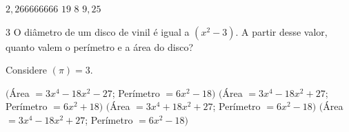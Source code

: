 \begin{boxlist}
\boxitem{} $2,266666666$
\boxitem{} $19$
 $8$
\boxitem{} $9,25$
\end{boxlist}










\num{3} O diâmetro de um disco de vinil é igual a $(x^2 - 3)$. A partir desse
valor, quanto valem o perímetro e a área do disco?

Considere $(\pi) = 3$.

\begin{boxlist}
\boxitem{} $($Área $= 3x^4 - 18x^2 - 27$; Perímetro $= 6x^2 - 18)$
\boxitem{} $($Área $= 3x^4 - 18x^2 + 27$; Perímetro $= 6x^2 + 18)$
\boxitem{} $($Área $= 3x^4 + 18x^2 + 27$; Perímetro $= 6x^2 - 18)$
 $($Área $= 3x^4 - 18x^2 + 27$; Perímetro $= 6x^2 - 18)$
\end{boxlist}






